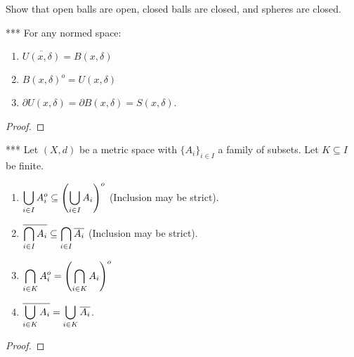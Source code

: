     \begin{exercise}
        Show that open balls are open, closed balls are closed, and spheres are closed.
    \end{exercise}

    \begin{proposition}***
        For any normed space:
            \begin{enumerate}[label = (\arabic*),itemsep=1pt,topsep=3pt]
                \item $\overline{U(x,\delta)} = B(x,\delta)$
                \item $B(x,\delta)^o = U(x,\delta)$ 
                \item $\partial U(x,\delta) = \partial B(x,\delta) = S(x,\delta)$.
            \end{enumerate}
    \end{proposition}
        \begin{proof}
        \end{proof}

    \begin{proposition}***
        Let $(X,d)$ be a metric space with $\{A_i\}_{i \in I}$ a family of subsets. Let $K \subseteq I$ be finite.
        \begin{enumerate}[label = (\arabic*),itemsep=5pt,topsep=8pt]
            \item $\displaystyle \bigcup_{i \in I}A_i^o \subseteq \left( \bigcup_{i \in I}A_i \right)^o$ (Inclusion may be strict). 
            \item $\displaystyle \overline{\bigcap_{i \in I} A_i} \subseteq \bigcap_{i \in I}\overline{A_i}$ (Inclusion may be strict). 
            \item $\displaystyle \bigcap_{i \in K}A_i^o = \left( \bigcap_{i \in K}A_i \right)^o$
            \item $\displaystyle \overline{\bigcup_{i \in K}A_i} = \bigcup_{i \in K}\overline{A_i}$.
        \end{enumerate}
    \end{proposition}
        \begin{proof}

        \end{proof}

